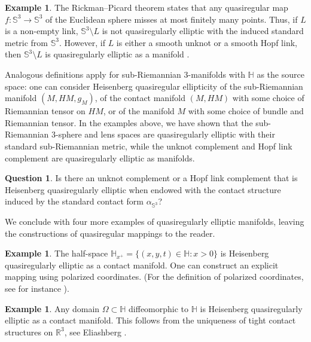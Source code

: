 \documentclass[10pt,letterpaper]{amsart}
\theoremstyle{definition}
\newtheorem{example}[thm]{Example}
\newtheorem{question}[thm]{Question}
\numberwithin{thm}{subsection}
\numberwithin{equation}{section}
\begin{document}
\begin{example}
The Rickman--Picard theorem states that any quasiregular map $f:{\mathbb S}^3 \to {\mathbb S}^3$ of the Euclidean sphere misses at most
finitely many points. Thus, if $L$ is a non-empty link, ${\mathbb S}^3 \setminus L$ is not quasiregularly elliptic with the induced standard metric from ${\mathbb S}^3$.
However, if $L$ is either a smooth unknot or a smooth Hopf link, then ${\mathbb S}^3\setminus L$ is quasiregularly elliptic {as a manifold} \cite{MR2832708}.
\end{example}

Analogous definitions apply for sub-Riemannian 3-manifolds with ${\mathbb H}$ as the source space: one can consider Heisenberg quasiregular ellipticity of the sub-Riemannian manifold $(M, HM, g_M)$, of the contact manifold $(M, HM)$ with {some} choice of Riemannian tensor on $HM$, or of the manifold $M$ with {some} choice of bundle and Riemannian tensor. In the examples above, we have shown that the  sub-Riemannian
$3$-sphere and lens spaces are quasiregularly elliptic with their standard sub-Riemannian metric, while the unknot complement and Hopf
link complement are quasiregularly elliptic {as manifolds}.

\begin{question}
Is there an unknot complement or a Hopf link complement that is Heisenberg quasiregularly elliptic when endowed with the contact structure induced by the standard contact form $\alpha_{{\mathbb S}^3}$?
\end{question}

We conclude with four more examples of quasiregularly elliptic manifolds, leaving the constructions of quasiregular mappings to the reader.

\begin{example}\label{ex:half_space}
The half-space ${\mathbb H}_{x^+} = \{ (x,y,t)\in {\mathbb H} {:} x>0\}$ is
Heisenberg quasiregularly elliptic {as a contact manifold}.
One can construct an explicit mapping using polarized coordinates.
(For the definition of polarized coordinates, see for instance
\cite[\S 2.1]{CDPT}).
\end{example}

\begin{example}
Any domain $\Omega \subset {\mathbb H}$ diffeomorphic to ${\mathbb H}$ is Heisenberg quasiregularly elliptic {as a contact manifold}. This follows from the uniqueness of tight contact structures on ${\mathbb R}^3$, see Eliashberg \cite{MR1162559}.
\end{example}
\end{document}
